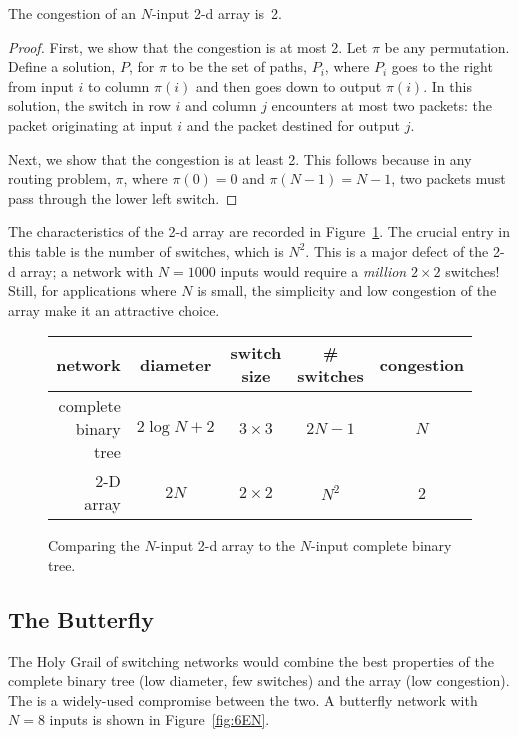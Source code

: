 \begin{theorem}
The congestion of an $N$-input 2-d array is~2.
\end{theorem}

\begin{proof}
First, we show that the congestion is at most 2.  Let $\pi$ be any
permutation.  Define a solution, $P$, for $\pi$ to be the set of
paths, $P_i$, where $P_i$ goes to the right from input $i$ to column
$\pi(i)$ and then goes down to output $\pi(i)$.  In this solution, the
switch in row $i$ and column $j$ encounters at most two packets: the
packet originating at input $i$ and the packet destined for output
$j$.

Next, we show that the congestion is at least 2.  This follows because in
any routing problem, $\pi$, where $\pi(0) = 0$ and $\pi(N-1) =
N-1$, two packets must pass through the lower left switch.
\end{proof}

The characteristics of the 2-d array are recorded in
Figure~\ref{fig:6EM}. The crucial entry in this table is the number of
switches, which is $N^2$.  This is a major defect of the 2-d array;
a network with $N = 1000$ inputs would require a \emph{million} $2
\times 2$ switches!  Still, for applications where $N$ is small, the
simplicity and low congestion of the array make it an attractive
choice.


\begin{figure}

\begin{tabular}{r|c|c|c|c}
\textbf{network} &
\textbf{diameter} &
\textbf{switch size} &
\textbf{\# switches} &
\textbf{congestion} \\ \hline
complete binary tree & $2 \log N + 2$ & $3 \times 3$ & $2N - 1$ & $N$ \\
2-D array            & $2 N$          & $2 \times 2$ & $N^2$    & 2
\end{tabular}

\caption{Comparing the $N$-input 2-d array to the $N$-input
  complete binary tree.}

\label{fig:6EM}

\end{figure}

\subsection{The Butterfly}

The Holy Grail of switching networks would combine the best properties
of the complete binary tree (low diameter, few switches) and the array
(low congestion).  The  is a widely-used compromise
between the two. A butterfly network with $N = 8$ inputs is shown in
Figure~\ref{fig:6EN}.

